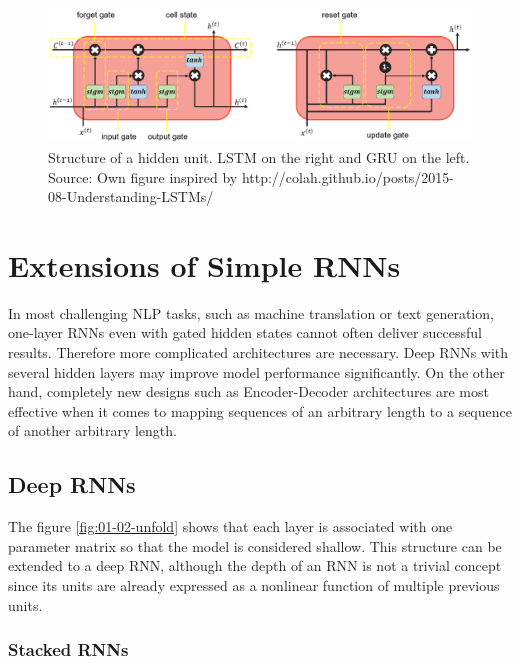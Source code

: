 \documentclass[]{krantz}
\begin{document}
\begin{figure}

{\centering \includegraphics[width=1\linewidth]{figures/01-02-rnns-and-their-applications-in-nlp/2_lstm_vs_gru} 

}

\caption{Structure of a hidden unit. LSTM on the right and GRU on the left. Source: Own figure inspired by http://colah.github.io/posts/2015-08-Understanding-LSTMs/}\label{fig:01-02-lstm-gru}
\end{figure}

\hypertarget{extensions-of-simple-rnns}{%
\section{Extensions of Simple RNNs}\label{extensions-of-simple-rnns}}

In most challenging NLP tasks, such as machine translation or text generation, one-layer RNNs even with gated hidden states cannot often deliver successful results. Therefore more complicated architectures are necessary. Deep RNNs with several hidden layers may improve model performance significantly. On the other hand, completely new designs such as Encoder-Decoder architectures are most effective when it comes to mapping sequences of an arbitrary length to a sequence of another arbitrary length.

\hypertarget{deep-rnns}{%
\subsection{Deep RNNs}\label{deep-rnns}}

The figure \ref{fig:01-02-unfold} shows that each layer is associated with one parameter matrix so that the model is considered shallow. This structure can be extended to a deep RNN, although the depth of an RNN is not a trivial concept since its units are already expressed as a nonlinear function of multiple previous units.

\hypertarget{stacked-rnns}{%
\subsubsection{Stacked RNNs}\label{stacked-rnns}}
\end{document}
